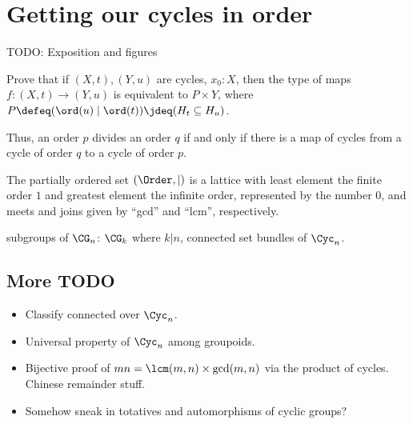 \section{Getting our cycles in order}
\label{sec:cycles-order}

{\color{casblue} TODO: Exposition and figures

\begin{xca}
  Prove that if $(X,t),(Y,u)$ are cycles, $x_0:X$,
  then the type of maps $f : (X,t) \to (Y,u)$ is equivalent to $P\times Y$,
  where $P\defeq(\ord(u) \mid \ord(t)) \jdeq (H_t \subseteq H_u)$.
\end{xca}

Thus, an order $p$ divides an order $q$ if and only if
there is a map of cycles from a cycle of order $q$
to a cycle of order $p$.
\begin{theorem}
  The partially ordered set $(\Order,|)$ is a lattice
  with least element the finite order $1$
  and greatest element the infinite order, represented by the number $0$,
  and meets and joins given by “gcd” and “lcm”, respectively.
\end{theorem}

subgroups of $\CG_n$: $\CG_k$ where $k | n$,
connected set bundles of $\Cyc_n$.

\subsection{More TODO}

\begin{itemize}
\item Classify connected \coverings over $\Cyc_n$.
\item Universal property of $\Cyc_n$ among groupoids.
\item Bijective proof of $mn = \lcm(m,n)\times\gcd(m,n)$ via the product of cycles.
  Chinese remainder stuff.
\item Somehow sneak in totatives and automorphisms of cyclic groups?
\end{itemize}
}


